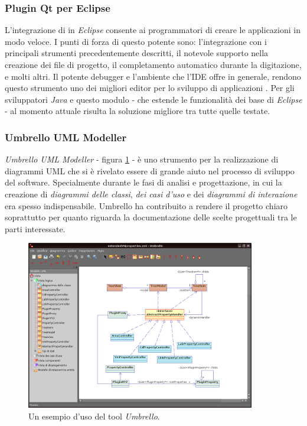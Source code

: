 \subsubsection{Plugin Qt per Eclipse}
L'integrazione di \qt{} in \emph{Eclipse} consente ai programmatori di creare le applicazioni in modo veloce. I punti di forza di questo potente \plugin{} sono: l'integrazione con i principali strumenti \qt{} precedentemente descritti, il notevole supporto nella creazione dei file di progetto, il completamento automatico durante la digitazione, e molti altri. Il potente debugger e l'ambiente che l'IDE offre in generale, rendono questo strumento uno dei migliori editor per lo sviluppo di applicazioni \qt{}.
Per gli sviluppatori \emph{Java} e \cpp{} questo modulo - che estende le funzionalità dei \plugin{} base di \emph{Eclipse} - al momento attuale risulta la soluzione migliore tra tutte quelle testate.

\subsubsection{Umbrello UML Modeller}
\textit{Umbrello UML Modeller} - figura \ref{figura:umbrello_example} - è uno strumento per la realizzazione di diagrammi UML che si è rivelato essere di grande aiuto nel processo di sviluppo del software. Specialmente durante le fasi di analisi e progettazione, in cui la creazione di \textit{diagrammi delle classi}, \textit{dei casi d'uso} e dei \textit{diagrammi di interazione} era spesso indispensabile. Umbrello ha contribuito a rendere il progetto chiaro soprattutto per quanto riguarda la documentazione delle scelte progettuali tra le parti interessate.

\begin{figure}[!htb]
	\centering
	\includegraphics[width=10cm]{images/umbrello.png}
	\caption{Un esempio d'uso del tool \emph{Umbrello}.}
	\label{figura:umbrello_example}
\end{figure}

